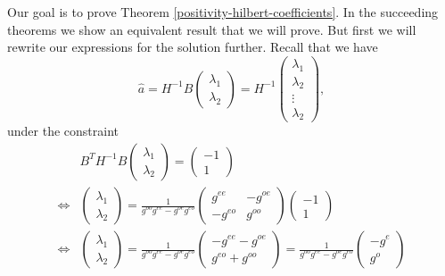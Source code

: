 \documentclass{article}
\theoremstyle{definition}
\theoremstyle{remark}
\numberwithin{equation}{section}
\begin{document}
Our goal is to prove Theorem \ref{positivity-hilbert-coefficients}. In the succeeding theorems we show an equivalent result that we will prove. But first we will rewrite our expressions for the solution further. Recall that we have \[ \hat{a} = H^{-1} B \begin{pmatrix} \lambda_1 \\ \lambda_2 \end{pmatrix} = H^{-1} \begin{pmatrix} \lambda_1 \\ \lambda_2 \\ \vdots \\ \lambda_2 \end{pmatrix},\]
under the constraint 
\begin{align}
& B^T H^{-1} B \begin{pmatrix}\lambda_1 \\ \lambda_2 \end{pmatrix} = \begin{pmatrix} -1 \\ 1 \end{pmatrix} \\
\iff &  \begin{pmatrix}\lambda_1 \\ \lambda_2 \end{pmatrix}  = \frac{1}{g^{oo}g^{ee}-g^{oe}g^{eo}} \begin{pmatrix} g^{ee} & -g^{oe} \\ -g^{eo} & g^{oo} \end{pmatrix} \begin{pmatrix} -1 \\ 1 \end{pmatrix} \\
\iff & \begin{pmatrix}\lambda_1 \\ \lambda_2 \end{pmatrix}  = \frac{1}{g^{oo}g^{ee}-g^{oe}g^{eo}} \begin{pmatrix} -g^{ee} - g^{oe} \\ g^{eo} + g^{oo} \end{pmatrix} =\frac{1}{g^{oo}g^{ee}-g^{oe}g^{eo}} \begin{pmatrix} -g^e \\ g^o \end{pmatrix} \label{lambda-expression}
\end{align}
\end{document}
